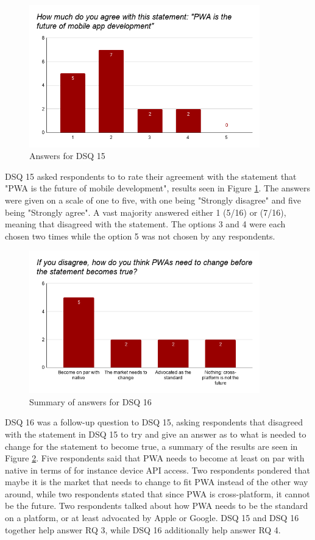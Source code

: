 \documentclass[a4paper,12pt]{article}
\begin{document}
\begin{figure}[ht!]
    \centering
    \includegraphics[width=10cm]{img/Results/dsq15.png}
    \caption{Answers for DSQ 15}
    \label{fig:res_devq15}
\end{figure}

DSQ 15 asked respondents to to rate their agreement with the statement that "PWA is the future of mobile development", results seen in Figure \ref{fig:res_devq15}. The answers were given on a scale of one to five, with one being "Strongly disagree" and five being "Strongly agree". A vast majority answered either 1 (5/16) or (7/16), meaning that disagreed with the statement. The options 3 and 4 were each chosen two times while the option 5 was not chosen by any respondents.

\begin{figure}[ht!]
    \centering
    \includegraphics[width=10cm]{img/Results/dsq16.png}
    \caption{Summary of answers for DSQ 16}
    \label{fig:res_devq16}
\end{figure}

\newpage
DSQ 16 was a follow-up question to DSQ 15, asking respondents that disagreed with the statement in DSQ 15 to try and give an answer as to what is needed to change for the statement to become true, a summary of the results are seen in Figure \ref{fig:res_devq16}. Five respondents said that PWA needs to become at least on par with native in terms of for instance device API access. Two respondents pondered that maybe it is the market that needs to change to fit PWA instead of the other way around, while two respondents stated that since PWA is cross-platform, it cannot be the future. Two respondents talked about how PWA needs to be the standard on a platform, or at least advocated by Apple or Google. DSQ 15 and DSQ 16 together help answer RQ 3, while DSQ 16 additionally help answer RQ 4.
\end{document}
